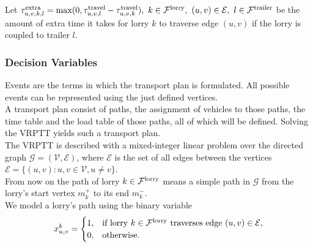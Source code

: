 

Let
$
  \tau^{\rm extra }_{u,v,k,l} =
  \max(0, \tau_{u,v,l}^{\rm travel} - \tau_{u,v,k}^{\rm travel} ),
\ k \in \mathcal{F}^{\rm lorry},
\ (u,v) \in \mathcal E,
\  l \in \mathcal{F}^{\rm trailer}$
be the amount of extra time it takes for lorry
$k $
to traverse edge
$(u,v)$
if the lorry is coupled to trailer
$l $. \\





\subsubsection{Decision Variables}


Events are the terms in which the transport plan is formulated.
All possible events can be represented using the just defined vertices. \\

A transport plan consist of paths, the assignment of vehicles to those paths, the time table and the load table of those paths, all of which will be defined.
Solving the VRPTT yields such a transport plan.\\

The VRPTT is described with a mixed-integer linear problem over the directed graph
$\mathcal G=(\mathcal V,\mathcal E)$,
where $\mathcal E$ is the set of all  
edges between the vertices
$ \mathcal E = \{ (u,v): u,v \in \mathcal V , u \neq v \} $. \\

From now on the path
of lorry
$k \in \mathcal F^{\rm lorry}$
means a simple path in $\mathcal G$ from the lorry's start vertex $m^+_k$ to its end $m^-_k$. \\

We model a lorry's path using the binary variable
\begin{align}
  x^{k}_{u,v} =  \begin{cases}
  1 ,& \text{if lorry $k \in \mathcal F^{\rm lorry}$ traverses edge $(u,v) \in \mathcal E$}, \\
  0,              & \text{otherwise. }
  \end{cases}
\end{align}



